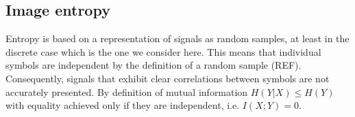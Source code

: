 





\subsection{Image entropy}
Entropy is based on a representation of signals as random samples, at least in the discrete case which is the one we consider here. This means that individual symbols are independent by the definition of a random sample (REF). Consequently, signals that exhibit clear correlations between symbols are not accurately presented. By definition of mutual information $H(Y|X) \leq H(Y)$ with equality achieved only if they are independent, i.e. $I(X;Y) = 0$. 

